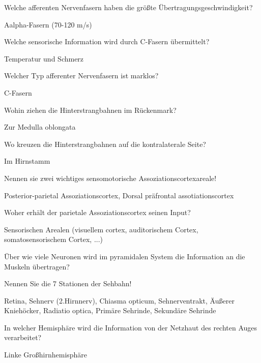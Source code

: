 \documentclass[10pt, a4paper]{exam}
\begin{document}
\begin{questions}
  \question Welche afferenten Nervenfasern haben die größte Übertragungsgeschwindigkeit?
  \begin{solution}
    Aalpha-Fasern (70-120 m/s)
  \end{solution}

  \question Welche sensorische Information wird durch C-Fasern übermittelt?
  \begin{solution}
    Temperatur und Schmerz
  \end{solution}

  \question Welcher Typ afferenter Nervenfasern ist marklos?
  \begin{solution}
    C-Fasern
  \end{solution}

  \question Wohin ziehen die Hinterstrangbahnen im Rückenmark?
  \begin{solution}
    Zur Medulla oblongata
  \end{solution}

  \question Wo kreuzen die Hinterstrangbahnen auf die kontralaterale Seite?
  \begin{solution}
    Im Hirnstamm
  \end{solution}

  \question Nennen sie zwei wichtiges sensomotorische Assoziationscortexareale!
  \begin{solution}
    Posterior-parietal Assoziationscortex, Dorsal präfrontal assotiationscortex
  \end{solution}

  \question Woher erhält der parietale Assoziationscortex seinen Input?
  \begin{solution}
    Sensorischen Arealen (visuellem cortex, auditorischem Cortex, somatosensorischem Cortex, ...)
  \end{solution}

  \question Über wie viele Neuronen wird im pyramidalen System die Information an die Muskeln übertragen?
  \begin{solution}

  \end{solution}

  \question Nennen Sie die 7 Stationen der Sehbahn!
  \begin{solution}
    Retina, Sehnerv (2.Hirnnerv), Chiasma opticum, Sehnerventrakt, Äußerer Kniehöcker, Radiatio optica, Primäre Sehrinde, Sekundäre Sehrinde
  \end{solution}

  \question In welcher Hemisphäre wird die Information von der Netzhaut des rechten Auges verarbeitet?
  \begin{solution}
    Linke Großhirnhemisphäre
  \end{solution}


\end{questions}
\end{document}
